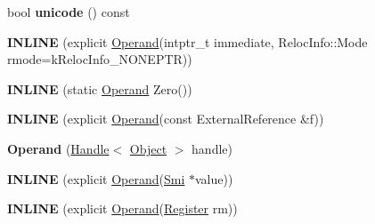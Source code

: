 \begin{DoxyCompactItemize}
\item 
bool {\bfseries unicode} () const \hypertarget{classv8_1_1internal_1_1_b_a_s_e___e_m_b_e_d_d_e_d_a0a72c123a5d414cc71f62ab413d95350}{}\label{classv8_1_1internal_1_1_b_a_s_e___e_m_b_e_d_d_e_d_a0a72c123a5d414cc71f62ab413d95350}

\item 
{\bfseries I\+N\+L\+I\+NE} (explicit \hyperlink{classv8_1_1internal_1_1_operand}{Operand}(intptr\+\_\+t immediate,                                                                                               Reloc\+Info\+::\+Mode rmode=k\+Reloc\+Info\+\_\+\+N\+O\+N\+E\+P\+TR))\hypertarget{classv8_1_1internal_1_1_b_a_s_e___e_m_b_e_d_d_e_d_ac7fe2e58790ee9467f9c8da659a35188}{}\label{classv8_1_1internal_1_1_b_a_s_e___e_m_b_e_d_d_e_d_ac7fe2e58790ee9467f9c8da659a35188}

\item 
{\bfseries I\+N\+L\+I\+NE} (static \hyperlink{classv8_1_1internal_1_1_operand}{Operand} Zero())\hypertarget{classv8_1_1internal_1_1_b_a_s_e___e_m_b_e_d_d_e_d_af3515fc7100ada6639a823b5e7a078b0}{}\label{classv8_1_1internal_1_1_b_a_s_e___e_m_b_e_d_d_e_d_af3515fc7100ada6639a823b5e7a078b0}

\item 
{\bfseries I\+N\+L\+I\+NE} (explicit \hyperlink{classv8_1_1internal_1_1_operand}{Operand}(const External\+Reference \&f))\hypertarget{classv8_1_1internal_1_1_b_a_s_e___e_m_b_e_d_d_e_d_a5a7a275240d4134c48a50f3f58fbc6e9}{}\label{classv8_1_1internal_1_1_b_a_s_e___e_m_b_e_d_d_e_d_a5a7a275240d4134c48a50f3f58fbc6e9}

\item 
{\bfseries Operand} (\hyperlink{classv8_1_1internal_1_1_handle}{Handle}$<$ \hyperlink{classv8_1_1internal_1_1_object}{Object} $>$ handle)\hypertarget{classv8_1_1internal_1_1_b_a_s_e___e_m_b_e_d_d_e_d_ac0a960c31fb67bf909833310bf361508}{}\label{classv8_1_1internal_1_1_b_a_s_e___e_m_b_e_d_d_e_d_ac0a960c31fb67bf909833310bf361508}

\item 
{\bfseries I\+N\+L\+I\+NE} (explicit \hyperlink{classv8_1_1internal_1_1_operand}{Operand}(\hyperlink{classv8_1_1internal_1_1_smi}{Smi} $\ast$value))\hypertarget{classv8_1_1internal_1_1_b_a_s_e___e_m_b_e_d_d_e_d_a167180552d3855f80f886be1fcfefaaa}{}\label{classv8_1_1internal_1_1_b_a_s_e___e_m_b_e_d_d_e_d_a167180552d3855f80f886be1fcfefaaa}

\item 
{\bfseries I\+N\+L\+I\+NE} (explicit \hyperlink{classv8_1_1internal_1_1_operand}{Operand}(\hyperlink{structv8_1_1internal_1_1_register}{Register} rm))\hypertarget{classv8_1_1internal_1_1_b_a_s_e___e_m_b_e_d_d_e_d_a4843bae09407712b9b5ab252c9d229e8}{}\label{classv8_1_1internal_1_1_b_a_s_e___e_m_b_e_d_d_e_d_a4843bae09407712b9b5ab252c9d229e8}


\end{DoxyCompactItemize}
